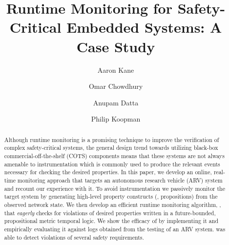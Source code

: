 \documentclass[]{llncs}
\begin{document}
\title{Runtime Monitoring for Safety-Critical Embedded Systems: A Case Study}


\author{Aaron Kane \and Omar Chowdhury \and Anupam Datta \and Philip Koopman}



\maketitle



\begin{abstract}

Although runtime monitoring is a promising technique to improve the verification of complex safety-critical systems, 
the general design trend towards utilizing black-box commercial-off-the-shelf (COTS) components means that these systems 
are not always amenable to instrumentation which is commonly used to produce the relevant events necessary for checking 
the desired properties. In this paper, we develop an online, real-time monitoring approach that targets an autonomous research 
vehicle (ARV) system and recount our experience with it. To avoid instrumentation we passively monitor the target system by 
generating high-level property constructs (\ie, propositions) from the observed network state. 
We then develop an efficient runtime monitoring algorithm, \monitor, that \emph{eagerly} checks for violations of desired properties 
written in a future-bounded, propositional metric temporal logic. 
We show the efficacy of \monitor by implementing it and empirically evaluating it against logs obtained from 
the testing of an ARV system. \monitor was able to detect violations of several safety requirements.




\end{abstract}
\end{document}
